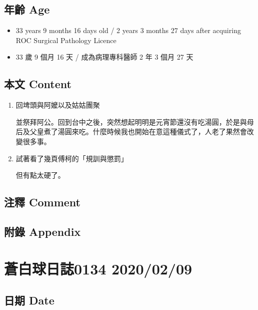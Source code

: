 \documentclass[a5paper, 12pt
]{book}
\providecommand{\tightlist}{%
  \setlength{\itemsep}{0pt}\setlength{\parskip}{0pt}}
\begin{document}
\hypertarget{ux5e74ux9f61-age-69}{%
\subsection{年齡 Age}\label{ux5e74ux9f61-age-69}}

\begin{itemize}
\tightlist
\item
  33 years 9 months 16 days old / 2 years 3 months 27 days after
  acquiring ROC Surgical Pathology Licence
\item
  33 歲 9 個月 16 天 / 成為病理專科醫師 2 年 3 個月 27 天
\end{itemize}

\hypertarget{ux672cux6587-content-69}{%
\subsection{本文 Content}\label{ux672cux6587-content-69}}

\begin{enumerate}
\def\labelenumi{\arabic{enumi}.}
\item
  回埤頭與阿嬤以及姑姑團聚

  並祭拜阿公。回到台中之後，突然想起明明是元宵節還沒有吃湯圓，於是與母后及父皇煮了湯圓來吃。什麼時候我也開始在意這種儀式了，人老了果然會改變很多事。
\item
  試著看了幾頁傅柯的「規訓與懲罰」

  但有點太硬了。
\end{enumerate}

\hypertarget{ux6ce8ux91cb-comment-68}{%
\subsection{注釋 Comment}\label{ux6ce8ux91cb-comment-68}}

\hypertarget{ux9644ux9304-appendix-69}{%
\subsection{附錄 Appendix}\label{ux9644ux9304-appendix-69}}

\hypertarget{ux84bcux767dux7403ux65e5ux8a8c0134-20200209}{%
\section{蒼白球日誌0134
2020/02/09}\label{ux84bcux767dux7403ux65e5ux8a8c0134-20200209}}

\hypertarget{ux65e5ux671f-date-70}{%
\subsection{日期 Date}\label{ux65e5ux671f-date-70}}
\end{document}
